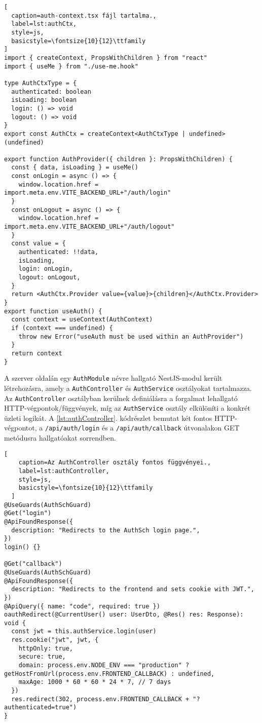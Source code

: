 \begin{minipage}{0.92\textwidth}
  \begin{lstlisting}[
  caption=auth-context.tsx fájl tartalma.,
  label=lst:authCtx,
  style=js,
  basicstyle=\fontsize{10}{12}\ttfamily
]
import { createContext, PropsWithChildren } from "react"
import { useMe } from "./use-me.hook"

type AuthCtxType = {
  authenticated: boolean
  isLoading: boolean
  login: () => void
  logout: () => void
}
export const AuthCtx = createContext<AuthCtxType | undefined>(undefined)

export function AuthProvider({ children }: PropsWithChildren) {
  const { data, isLoading } = useMe()
  const onLogin = async () => {
    window.location.href = import.meta.env.VITE_BACKEND_URL+"/auth/login"
  }
  const onLogout = async () => {
    window.location.href = import.meta.env.VITE_BACKEND_URL+"/auth/logout"
  }
  const value = {
    authenticated: !!data,
    isLoading,
    login: onLogin,
    logout: onLogout,
  }
  return <AuthCtx.Provider value={value}>{children}</AuthCtx.Provider>
}
export function useAuth() {
  const context = useContext(AuthContext)
  if (context === undefined) {
    throw new Error("useAuth must be used within an AuthProvider")
  }
  return context
}
\end{lstlisting}
\end{minipage}

A szerver oldalán egy \verb|AuthModule| névre hallgató NestJS-modul került létrehozásra, amely a \verb|AuthController| és \verb|AuthService| osztályokat tartalmazza. Az \verb|AuthController| osztályban kerülnek definiálásra a forgalmat lehallgató HTTP-végpontok/függvények, míg az \verb|AuthService| osztály elkülöníti a konkrét üzleti logikát. A \ref{lst:authController}. kódrészlet bemutat két fontos HTTP-végpontot, a \verb|/api/auth/login| és a \verb|/api/auth/callback| útvonalakon GET metódusra hallgatóakat sorrendben.

\begin{minipage}{0.92\textwidth}
  \begin{lstlisting}[
    caption=Az AuthController osztály fontos függvényei.,
    label=lst:authController,
    style=js,
    basicstyle=\fontsize{10}{12}\ttfamily
  ]
@UseGuards(AuthSchGuard)
@Get("login")
@ApiFoundResponse({
  description: "Redirects to the AuthSch login page.",
})
login() {}

@Get("callback")
@UseGuards(AuthSchGuard)
@ApiFoundResponse({
  description: "Redirects to the frontend and sets cookie with JWT.",
})
@ApiQuery({ name: "code", required: true })
oauthRedirect(@CurrentUser() user: UserDto, @Res() res: Response): void {
  const jwt = this.authService.login(user)
  res.cookie("jwt", jwt, {
    httpOnly: true,
    secure: true,
    domain: process.env.NODE_ENV === "production" ? getHostFromUrl(process.env.FRONTEND_CALLBACK) : undefined,
    maxAge: 1000 * 60 * 60 * 24 * 7, // 7 days
  })
  res.redirect(302, process.env.FRONTEND_CALLBACK + "?authenticated=true")
}
\end{lstlisting}
\end{minipage}

